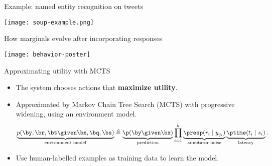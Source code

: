 \begin{block}{Example: named entity recognition on tweets}
  \begin{center}
    \texttt{[image: soup-example.png]}
  \end{center}
\end{block}
\vfill

\begin{block}{How marginals evolve after incorporating responses}
  \begin{center}
    \texttt{[image: behavior-poster]}
  \end{center}
\end{block}
\vfill

\begin{block}{Approximating utility with MCTS}
  \begin{itemize}
    \item The system chooses actions that \textbf{maximize utility}.
    \item Approximated by Markov Chain Tree Search (MCTS) with progressive widening, using an environment model.
  \begin{align*}
    \label{eqn:dynamics}
  \underbrace{p(\by, \br, \bt \given \bx, \bq, \bs)}_{\textrm{environment model}} \eqdef \underbrace{\p(\by \given \bx)}_{\textrm{prediction}} \prod_{i=1}^k \underbrace{\presp(r_i \mid y_{q_i})}_{\textrm{annotator noise}} \underbrace{\ptime(t_i \mid s_i)}_{\textrm{latency}}.
  \end{align*}
    \item Use human-labelled examples as training data to learn the model.
  \end{itemize}

\end{block}
\vfill

